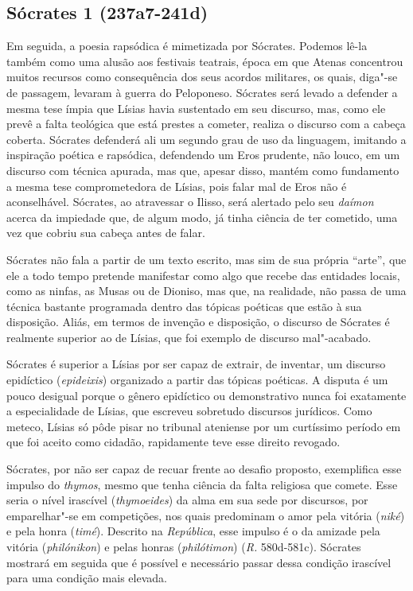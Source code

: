\subsection{Sócrates 1 (237a7-241d)} 

Em seguida, a poesia rapsódica é
mimetizada por Sócrates. Podemos lê-la também como uma alusão aos
festivais teatrais, época em que Atenas concentrou muitos recursos como
consequência dos seus acordos militares, os quais, diga"-se de passagem,
levaram à guerra do Peloponeso. Sócrates será levado a defender a mesma
tese ímpia que Lísias havia sustentado em seu discurso, mas, como ele
prevê a falta teológica que está prestes a cometer, realiza o discurso
com a cabeça coberta. Sócrates defenderá ali um segundo grau de uso da
linguagem, imitando a inspiração poética e rapsódica, defendendo um Eros
prudente, não louco, em um discurso com técnica apurada, mas que, apesar
disso, mantém como fundamento a mesma tese comprometedora de Lísias,
pois falar mal de Eros não é aconselhável. Sócrates, ao atravessar o
Ilisso, será alertado pelo seu \emph{daímon} acerca da impiedade que, de
algum modo, já tinha ciência de ter cometido, uma vez que cobriu sua
cabeça antes de falar.

Sócrates não fala a partir de um texto escrito, mas sim de sua própria
``arte'', que ele a todo tempo pretende manifestar como algo que recebe
das entidades locais, como as ninfas, as Musas ou de Dioniso, mas que,
na realidade, não passa de uma técnica bastante programada dentro das
tópicas poéticas que estão à sua disposição. Aliás, em termos de
invenção e disposição, o discurso de Sócrates é realmente superior ao de
Lísias, que foi exemplo de discurso mal"-acabado.

Sócrates é superior a Lísias por ser capaz de extrair, de inventar, um
discurso epidíctico (\emph{epideixis}) organizado a partir das tópicas
poéticas. A disputa é um pouco desigual porque o gênero epidíctico ou
demonstrativo nunca foi exatamente a especialidade de Lísias, que
escreveu sobretudo discursos jurídicos. Como meteco, Lísias só pôde
pisar no tribunal ateniense por um curtíssimo período em que foi aceito
como cidadão, rapidamente teve esse direito revogado.

Sócrates, por não ser capaz de recuar frente ao desafio proposto,
exemplifica esse impulso do \emph{thymos}, mesmo que tenha ciência da
falta religiosa que comete. Esse seria o nível irascível
(\emph{thymoeides}) da alma em sua sede por discursos, por emparelhar"-se
em competições, nos quais predominam o amor pela vitória (\emph{niké}) e
pela honra (\emph{timé}). Descrito na \emph{República}, esse impulso é
o da amizade pela vitória (\emph{philónikon}) e pelas honras
(\emph{philótimon}) (\emph{R.} 580d-581c). Sócrates mostrará em seguida
que é possível e necessário passar dessa condição irascível para uma
condição mais elevada.

